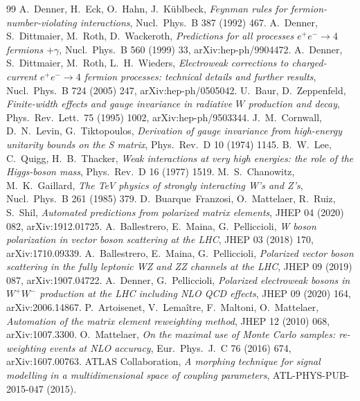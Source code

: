\documentclass[11pt]{article}
\begin{document}
\begin{thebibliography}{99}
 A.~Denner, H.~Eck, O.~Hahn, J.~K\"ublbeck, \emph{Feynman rules for fermion-number-violating interactions}, Nucl.\ Phys.\ B 387 (1992) 467.
 A.~Denner, S.~Dittmaier, M.~Roth, D.~Wackeroth, \emph{Predictions for all processes $e^+e^-\to 4$ fermions $+\gamma$}, Nucl.\ Phys.\ B 560 (1999) 33, arXiv:hep-ph/9904472.
 A.~Denner, S.~Dittmaier, M.~Roth, L.~H.~Wieders, \emph{Electroweak corrections to charged-current $e^+e^-\to4$ fermion processes: technical details and further results}, Nucl.\ Phys.\ B 724 (2005) 247, arXiv:hep-ph/0505042.
 U.~Baur, D.~Zeppenfeld, \emph{Finite-width effects and gauge invariance in radiative $W$ production and decay}, Phys.\ Rev.\ Lett.\ 75 (1995) 1002, arXiv:hep-ph/9503344.
 J.~M.~Cornwall, D.~N.~Levin, G.~Tiktopoulos, \emph{Derivation of gauge invariance from high-energy unitarity bounds on the S matrix}, Phys.\ Rev.\ D 10 (1974) 1145.
 B.~W.~Lee, C.~Quigg, H.~B.~Thacker, \emph{Weak interactions at very high energies: the role of the Higgs-boson mass}, Phys.\ Rev.\ D 16 (1977) 1519.
 M.~S.~Chanowitz, M.~K.~Gaillard, \emph{The TeV physics of strongly interacting W's and Z's}, Nucl.\ Phys.\ B 261 (1985) 379.
 D.~Buarque~Franzosi, O.~Mattelaer, R.~Ruiz, S.~Shil, \emph{Automated predictions from polarized matrix elements}, JHEP 04 (2020) 082, arXiv:1912.01725.
 A.~Ballestrero, E.~Maina, G.~Pelliccioli, \emph{W boson polarization in vector boson scattering at the LHC}, JHEP 03 (2018) 170, arXiv:1710.09339.
 A.~Ballestrero, E.~Maina, G.~Pelliccioli, \emph{Polarized vector boson scattering in the fully leptonic WZ and ZZ channels at the LHC}, JHEP 09 (2019) 087, arXiv:1907.04722.
 A.~Denner, G.~Pelliccioli, \emph{Polarized electroweak bosons in $W^+W^-$ production at the LHC including NLO QCD effects}, JHEP 09 (2020) 164, arXiv:2006.14867.
 P.~Artoisenet, V.~Lema\^itre, F.~Maltoni, O.~Mattelaer, \emph{Automation of the matrix element reweighting method}, JHEP 12 (2010) 068, arXiv:1007.3300.
 O.~Mattelaer, \emph{On the maximal use of Monte Carlo samples: re-weighting events at NLO accuracy}, Eur.\ Phys.\ J.\ C 76 (2016) 674, arXiv:1607.00763.
 ATLAS Collaboration, \emph{A morphing technique for signal modelling in a multidimensional space of coupling parameters}, ATL-PHYS-PUB-2015-047 (2015).

\end{thebibliography}
\end{document}
